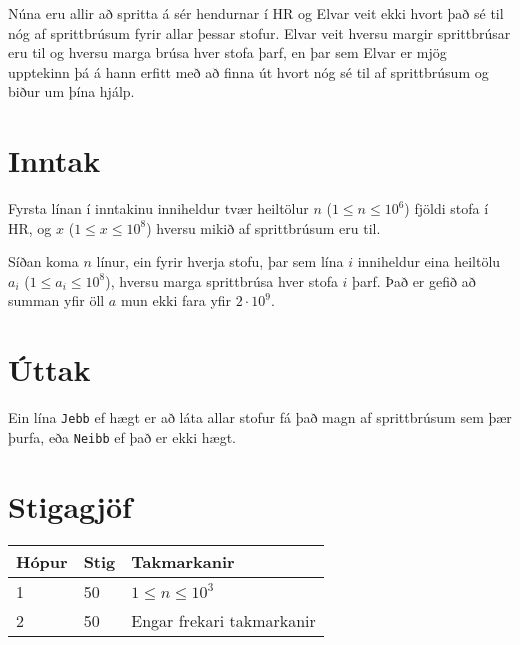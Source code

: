 
Núna eru allir að spritta á sér hendurnar í HR og Elvar veit ekki hvort það sé til nóg af sprittbrúsum fyrir allar þessar stofur. 
Elvar veit hversu margir sprittbrúsar eru til og hversu marga brúsa hver stofa þarf,
en þar sem Elvar er mjög upptekinn þá á hann erfitt með að finna út hvort nóg sé til af sprittbrúsum og biður um þína hjálp.

\section*{Inntak}
Fyrsta línan í inntakinu inniheldur tvær heiltölur $n$ ($1 \leq n \leq 10^6$) fjöldi stofa í HR, og
$x$ ($1 \leq x \leq 10^8$) hversu mikið af sprittbrúsum eru til.

Síðan koma $n$ línur, ein fyrir hverja stofu, þar sem lína $i$ inniheldur eina
heiltölu $a_i$ ($1 \leq a_i \leq 10^8$), hversu marga sprittbrúsa hver stofa $i$ þarf.
Það er gefið að summan yfir öll $a$ mun ekki fara yfir $2 \cdot 10^9$.

\section*{Úttak}
Ein lína \texttt{Jebb} ef hægt er að láta allar stofur fá það magn af sprittbrúsum sem þær þurfa, eða \texttt{Neibb} ef það er ekki hægt.

\section*{Stigagjöf}
\begin{tabular}{|l|l|l|}
\hline
Hópur & Stig & Takmarkanir \\ \hline
1     & 50   & $1 \leq n \leq 10^3$ \\ \hline
2     & 50   & Engar frekari takmarkanir\\ \hline
\end{tabular}

